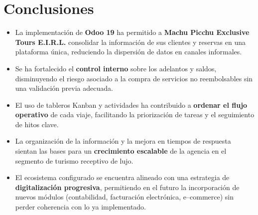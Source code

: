 \section{Conclusiones}

\begin{itemize}
    \item La implementación de \textbf{Odoo 19} ha permitido a \textbf{Machu Picchu Exclusive Tours E.I.R.L.} consolidar la información de sus clientes y reservas en una plataforma única, reduciendo la dispersión de datos en canales informales.
    \item Se ha fortalecido el \textbf{control interno} sobre los adelantos y saldos, disminuyendo el riesgo asociado a la compra de servicios no reembolsables sin una validación previa adecuada.
    \item El uso de tableros Kanban y actividades ha contribuido a \textbf{ordenar el flujo operativo} de cada viaje, facilitando la priorización de tareas y el seguimiento de hitos clave.
    \item La organización de la información y la mejora en tiempos de respuesta sientan las bases para un \textbf{crecimiento escalable} de la agencia en el segmento de turismo receptivo de lujo.
    \item El ecosistema configurado se encuentra alineado con una estrategia de \textbf{digitalización progresiva}, permitiendo en el futuro la incorporación de nuevos módulos (contabilidad, facturación electrónica, e--commerce) sin perder coherencia con lo ya implementado.
\end{itemize}

